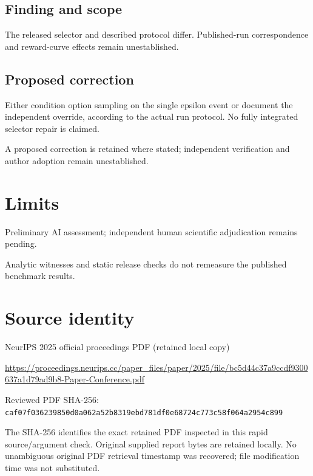 \documentclass[11pt]{article}
\begin{document}
\subsection*{Finding and scope}

The released selector and described protocol differ. Published-run correspondence and reward-curve effects remain unestablished.

\subsection*{Proposed correction}

Either condition option sampling on the single epsilon event or document the independent override, according to the actual run protocol. No fully integrated selector repair is claimed.

A proposed correction is retained where stated; independent verification and author adoption remain unestablished.

\section*{Limits}

Preliminary AI assessment; independent human scientific adjudication remains pending.\par

Analytic witnesses and static release checks do not remeasure the published benchmark results.\par

\section*{Source identity}

NeurIPS 2025 official proceedings PDF (retained local copy)

\url{https://proceedings.neurips.cc/paper_files/paper/2025/file/bc5d44c37a9ccdf9300637a1d79ad9b8-Paper-Conference.pdf}

Reviewed PDF SHA-256: \nolinkurl{caf07f036239850d0a062a52b8319ebd781df0e68724c773c58f064a2954c899}

The SHA-256 identifies the exact retained PDF inspected in this rapid source/argument check. Original supplied report bytes are retained locally. No unambiguous original PDF retrieval timestamp was recovered; file modification time was not substituted.
\end{document}
